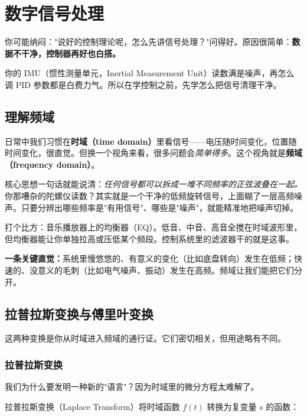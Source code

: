 \section{数字信号处理}

你可能纳闷："说好的控制理论呢，怎么先讲信号处理？"问得好。原因很简单：\textbf{数据不干净，控制器再好也白搭。}

你的 IMU（惯性测量单元，Inertial Measurement Unit）读数满是噪声，再怎么调 PID 参数都是白费力气。所以在学控制之前，先学怎么把信号清理干净。

\subsection{理解频域}

日常中我们习惯在\textbf{时域（time domain）}里看信号——电压随时间变化，位置随时间变化，很直觉。但换一个视角来看，很多问题会\textit{简单得多}。这个视角就是\textbf{频域（frequency domain）}。

核心思想一句话就能说清：\textit{任何信号都可以拆成一堆不同频率的正弦波叠在一起。}你那嘈杂的陀螺仪读数？其实就是一个干净的低频旋转信号，上面糊了一层高频噪声。只要分辨出哪些频率是"有用信号"、哪些是"噪声"，就能精准地把噪声切掉。

打个比方：音乐播放器上的均衡器（EQ）。低音、中音、高音全搅在时域波形里，但均衡器能让你单独拉高或压低某个频段。控制系统里的滤波器干的就是这事。

\textbf{一条关键直觉：}系统里慢悠悠的、有意义的变化（比如底盘转向）发生在低频；快速的、没意义的毛刺（比如电气噪声、振动）发生在高频。频域让我们能把它们分开。

\subsection{拉普拉斯变换与傅里叶变换}

这两种变换是你从时域进入频域的通行证。它们密切相关，但用途略有不同。

\subsubsection{拉普拉斯变换}

我们为什么要发明一种新的"语言"？因为时域里的微分方程太难解了。

拉普拉斯变换（Laplace Transform）将时域函数 $f(t)$ 转换为复变量 $s$ 的函数：

